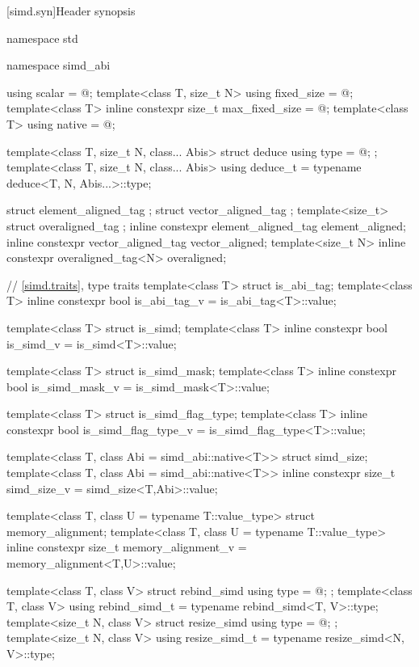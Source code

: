 [simd.syn]{Header \texorpdfstring{}{<simd>} synopsis}

\begin{codeblock}
namespace std {
  namespace simd_abi {
    using scalar = @\seebelow@;
    template<class T, size_t N> using fixed_size = @\seebelow@;
    template<class T> inline constexpr size_t max_fixed_size = @\impdef@;
    template<class T> using native = @\impdef@;

    template<class T, size_t N, class... Abis> struct deduce { using type = @\seebelow@; };
    template<class T, size_t N, class... Abis> using deduce_t =
      typename deduce<T, N, Abis...>::type;
  }

  struct element_aligned_tag {};
  struct vector_aligned_tag {};
  template<size_t> struct overaligned_tag {};
  inline constexpr element_aligned_tag element_aligned{};
  inline constexpr vector_aligned_tag vector_aligned{};
  template<size_t N> inline constexpr overaligned_tag<N> overaligned{};

  // \ref{simd.traits},  type traits
  template<class T> struct is_abi_tag;
  template<class T> inline constexpr bool is_abi_tag_v = is_abi_tag<T>::value;

  template<class T> struct is_simd;
  template<class T> inline constexpr bool is_simd_v = is_simd<T>::value;

  template<class T> struct is_simd_mask;
  template<class T> inline constexpr bool is_simd_mask_v = is_simd_mask<T>::value;

  template<class T> struct is_simd_flag_type;
  template<class T> inline constexpr bool is_simd_flag_type_v =
    is_simd_flag_type<T>::value;

  template<class T, class Abi = simd_abi::native<T>> struct simd_size;
  template<class T, class Abi = simd_abi::native<T>>
    inline constexpr size_t simd_size_v = simd_size<T,Abi>::value;

  template<class T, class U = typename T::value_type> struct memory_alignment;
  template<class T, class U = typename T::value_type>
    inline constexpr size_t memory_alignment_v = memory_alignment<T,U>::value;

  template<class T, class V> struct rebind_simd { using type = @\seebelow@; };
  template<class T, class V> using rebind_simd_t = typename rebind_simd<T, V>::type;
  template<size_t N, class V> struct resize_simd { using type = @\seebelow@; };
  template<size_t N, class V> using resize_simd_t = typename resize_simd<N, V>::type;

}
\end{codeblock}
